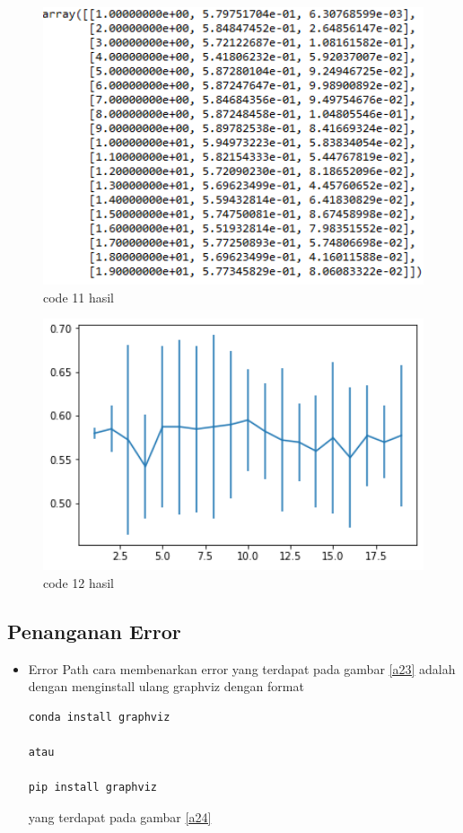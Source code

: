 \begin{itemize}
\begin{figure}
\centerline{\includegraphics[width=1\textwidth]{figures/fathi/chapter2/chapter3/11.PNG}}
\caption{code 11 hasil}
\label{a21}
\end{figure}

\begin{figure}
\centerline{\includegraphics[width=1\textwidth]{figures/fathi/chapter2/chapter3/12.PNG}}
\caption{code 12 hasil}
\label{a22}
\end{figure}

\end{itemize}

\subsection {Penanganan Error}
\begin{itemize}
\item Error Path
\subitem
cara membenarkan error yang terdapat pada gambar \ref{a23} adalah dengan menginstall ulang graphviz dengan format 
\begin{verbatim}
conda install graphviz

atau

pip install graphviz
\end{verbatim}
yang terdapat pada gambar \ref{a24}
\end{itemize}

